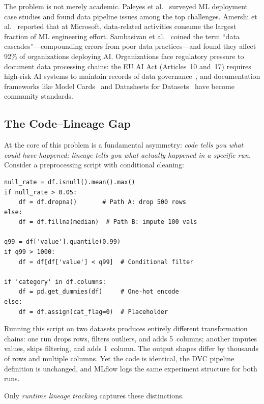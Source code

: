 \documentclass[10pt,twocolumn]{article}
\begin{document}
The problem is not merely academic. Paleyes et al.~\cite{paleyes2022} surveyed ML deployment case studies and found data pipeline issues among the top challenges. Amershi et al.~\cite{amershi2019} reported that at Microsoft, data-related activities consume the largest fraction of ML engineering effort. Sambasivan et al.~\cite{sambasivan2021} coined the term ``data cascades''---compounding errors from poor data practices---and found they affect 92\% of organizations deploying AI. Organizations face regulatory pressure to document data processing chains: the EU AI Act (Articles~10 and~17) requires high-risk AI systems to maintain records of data governance~\cite{veale2021}, and documentation frameworks like Model Cards~\cite{mitchell2019} and Datasheets for Datasets~\cite{gebru2021} have become community standards.

\subsection{The Code--Lineage Gap}

At the core of this problem is a fundamental asymmetry: \emph{code tells you what could have happened; lineage tells you what actually happened in a specific run.} Consider a preprocessing script with conditional cleaning:

\begin{lstlisting}[numbers=none,caption={The same code produces different lineage depending on runtime data conditions.},label={lst:codegap}]
null_rate = df.isnull().mean().max()
if null_rate > 0.05:
    df = df.dropna()       # Path A: drop 500 rows
else:
    df = df.fillna(median)  # Path B: impute 100 vals

q99 = df['value'].quantile(0.99)
if q99 > 1000:
    df = df[df['value'] < q99]  # Conditional filter

if 'category' in df.columns:
    df = pd.get_dummies(df)     # One-hot encode
else:
    df = df.assign(cat_flag=0)  # Placeholder
\end{lstlisting}

Running this script on two datasets produces entirely different transformation chains: one run drops rows, filters outliers, and adds 5~columns; another imputes values, skips filtering, and adds 1~column. The output shapes differ by thousands of rows and multiple columns. Yet the code is identical, the DVC pipeline definition is unchanged, and MLflow logs the same experiment structure for both runs.

Only \emph{runtime lineage tracking} captures these distinctions.
\end{document}
